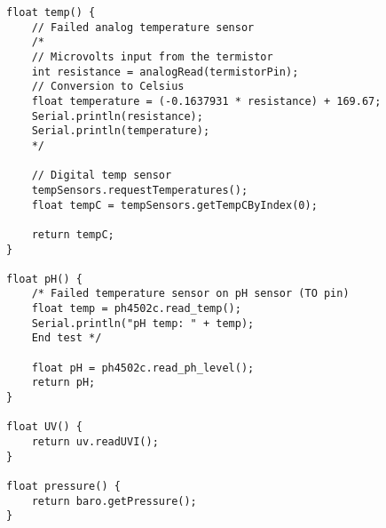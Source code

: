 \begin{lstlisting}
float temp() {
	// Failed analog temperature sensor
	/*
	// Microvolts input from the termistor
	int resistance = analogRead(termistorPin);
	// Conversion to Celsius
	float temperature = (-0.1637931 * resistance) + 169.67;
	Serial.println(resistance);
	Serial.println(temperature);
	*/
	
	// Digital temp sensor
	tempSensors.requestTemperatures();
	float tempC = tempSensors.getTempCByIndex(0);
	
	return tempC;
}

float pH() {  
	/* Failed temperature sensor on pH sensor (TO pin)
	float temp = ph4502c.read_temp();
	Serial.println("pH temp: " + temp); 
	End test */
	
	float pH = ph4502c.read_ph_level();
	return pH;
}

float UV() {
	return uv.readUVI();
}

float pressure() {
	return baro.getPressure();
}
		\end{lstlisting}